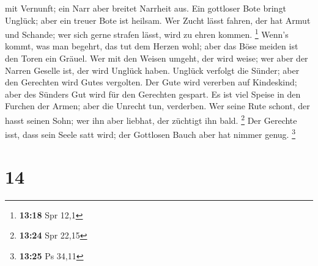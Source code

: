 mit Vernunft; ein Narr aber breitet Narrheit aus.  Ein
gottloser Bote bringt Unglück; aber ein treuer Bote ist heilsam.
 Wer Zucht lässt fahren, der hat Armut und Schande; wer
sich gerne strafen lässt, wird zu ehren kommen. \footnote{\textbf{13:18}
  Spr 12,1}  Wenn's kommt, was man begehrt, das tut dem
Herzen wohl; aber das Böse meiden ist den Toren ein Gräuel.
 Wer mit den Weisen umgeht, der wird weise; wer aber der
Narren Geselle ist, der wird Unglück haben.  Unglück
verfolgt die Sünder; aber den Gerechten wird Gutes vergolten.
 Der Gute wird vererben auf Kindeskind; aber des Sünders
Gut wird für den Gerechten gespart.  Es ist viel Speise
in den Furchen der Armen; aber die Unrecht tun, verderben.
 Wer seine Rute schont, der hasst seinen Sohn; wer ihn
aber liebhat, der züchtigt ihn bald. \footnote{\textbf{13:24} Spr 22,15}
 Der Gerechte isst, dass sein Seele satt wird; der
Gottlosen Bauch aber hat nimmer genug. \footnote{\textbf{13:25} Ps 34,11}

\hypertarget{section-5}{%
\section{14}\label{section-5}}

